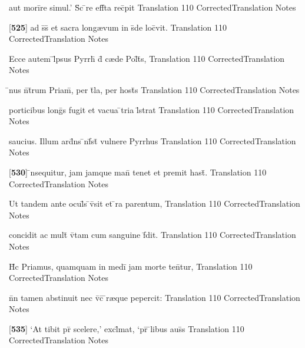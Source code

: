 \latline
  {aut mori\={}re simul.'  S\={\macron {\i}}c \={}re eff\={}ta rec\={}pit}
  { Translation }
  {110}
  { CorrectedTranslation }
  { Notes }


\latline
  {[\textbf{525}] ad s\={}s\={} et sacra long{\ae}vum in s\={}de loc\={}vit.}
  { Translation }
  {110}
  { CorrectedTranslation }
  { Notes }


\latline
  {Ecce autem \={}l\={}psus Pyrrh\={\macron {\i}} d\={} c{\ae}de Pol\={\macron {\i}}t\={}s,}
  { Translation }
  {110}
  { CorrectedTranslation }
  { Notes }


\latline
  {\={}nus n\={}t\={}rum Priam\={\macron {\i}}, per t\={}la, per host\={\macron {\i}}s}
  { Translation }
  {110}
  { CorrectedTranslation }
  { Notes }


\latline
  {porticibus long\={\macron {\i}}s fugit et vacua \={}tria l\={}strat}
  { Translation }
  {110}
  { CorrectedTranslation }
  { Notes }


\latline
  {saucius.  Illum ard\={}ns \={\macron {\i}}nf\={}st\={} vulnere Pyrrhus}
  { Translation }
  {110}
  { CorrectedTranslation }
  { Notes }


\latline
  {[\textbf{530}] \={\macron {\i}}nsequitur, jam jamque man\={} tenet et premit hast\={}.}
  { Translation }
  {110}
  { CorrectedTranslation }
  { Notes }


\latline
  {Ut tandem ante ocul\={}s \={}v\={}sit et \={}ra parentum,}
  { Translation }
  {110}
  { CorrectedTranslation }
  { Notes }


\latline
  {concidit ac mult\={} v\={\macron {\i}}tam cum sanguine f\={}dit.}
  { Translation }
  {110}
  { CorrectedTranslation }
  { Notes }


\latline
  {H\={\macron {\i}}c Priamus, quamquam in medi\={} jam morte ten\={}tur,}
  { Translation }
  {110}
  { CorrectedTranslation }
  { Notes }


\latline
  {n\={}n tamen abstinuit nec v\={}c\={\macron {\i}} \={\macron {\i}}r{\ae}que pepercit:}
  { Translation }
  {110}
  { CorrectedTranslation }
  { Notes }


\latline
  {[\textbf{535}] `At tibit pr\={} scelere,' excl\={}mat, `pr\={} \={}libus aus\={\macron {\i}}s}
  { Translation }
  {110}
  { CorrectedTranslation }
  { Notes }


